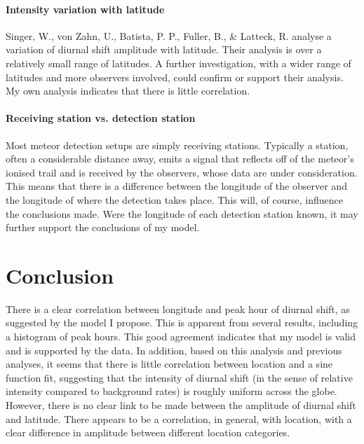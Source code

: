 \paragraph{Intensity variation with latitude\\}
Singer, W., von Zahn, U., Batista, P. P., Fuller, B., \& Latteck, R. \cite{latitudes} analyse a variation of diurnal shift amplitude with latitude. Their analysis is over a relatively small range of latitudes. A further investigation, with a wider range of latitudes and more observers involved, could confirm or support their analysis. My own analysis indicates that there is little correlation.
\paragraph{Receiving station vs. detection station}
Most meteor detection setups are simply receiving stations. Typically a station, often a considerable distance away, emits a signal that reflects off of the meteor's ionised trail and is received by the observers, whose data are under consideration. This means that there is a difference between the longitude of the observer and the longitude of where the detection takes place. This will, of course, influence the conclusions made. Were the longitude of each detection station known, it may further support the conclusions of my model.
\section{Conclusion}
There is a clear correlation between longitude and peak hour of diurnal shift, as suggested by the model I propose. This is apparent from several results, including a histogram of peak hours. This good agreement indicates that my model is valid and is supported by the data. In addition, based on this analysis and previous analyses, it seems that there is little correlation between location and a sine function fit, suggesting that the intensity of diurnal shift (in the sense of relative intensity compared to background rates) is roughly uniform across the globe. However, there is no clear link to be made between the amplitude of diurnal shift and latitude. There appears to be a correlation, in general, with location, with a clear difference in amplitude between different location categories.